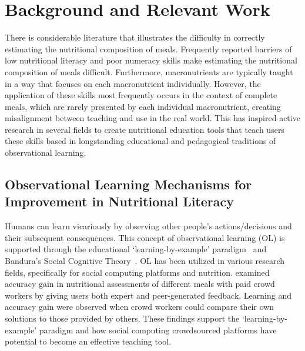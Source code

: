 \vspace{-5pt}
\section{Background and Relevant Work}
There is considerable literature that illustrates the difficulty in correctly estimating the nutritional composition of meals\cite{berkman2011low,chandon2007obesity,chaudhry2016evaluation,chaudry2013formative,stanton2006nutrition,kim2014energy,lansky1982estimates,schwartz2006ability}. Frequently reported barriers of low nutritional literacy and poor numeracy skills make estimating the nutritional composition of meals difficult. Furthermore, macronutrients are typically taught in a way that focuses on each macronutrient individually. However, the application of these skills most frequently occurs in the context of complete meals, which are rarely presented by each individual macronutrient, creating misalignment between teaching and use in the real world. This has inspired active research in several fields to create nutritional education tools that teach users these skills based in longstanding educational and pedagogical traditions of observational learning.

\vspace{-5pt}
\subsection{Observational Learning Mechanisms for Improvement in Nutritional Literacy}
Humans can learn vicariously by observing other people's actions/decisions and their subsequent consequences. This concept of observational learning (OL) is supported through the educational
`learning-by-example’ paradigm~\cite{anderson1997role,atkinson2000learning,brown1988preschool} and Bandura's Social Cognitive Theory~\cite{bandura1989human,bandura1998health}. OL has been utilized in various research fields, specifically for social computing platforms and nutrition. \cite{mamykina2016learning} examined accuracy gain in nutritional assessments of different meals with paid crowd workers by giving users both expert and peer-generated feedback. 
Learning and accuracy gain were %
observed when crowd workers could compare their own solutions to those provided by others. These findings support the `learning-by-example’ paradigm and how social computing crowdsourced platforms have potential to become an effective teaching tool. 

